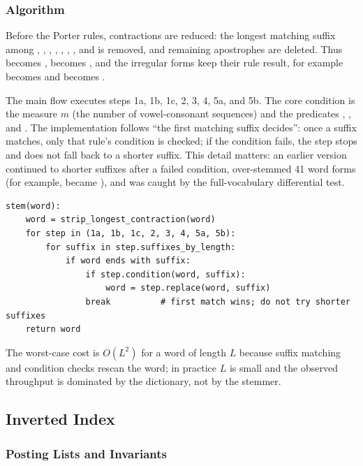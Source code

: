 \subsubsection{Algorithm}

Before the Porter rules, contractions are reduced: the longest matching suffix
among , , , , , ,
, and  is removed, and remaining apostrophes are deleted.
Thus  becomes ,  becomes , and
the irregular forms keep their rule result, for example  becomes
 and  becomes .

The main flow executes steps 1a, 1b, 1c, 2, 3, 4, 5a, and 5b. The core
condition is the measure $m$ (the number of vowel-consonant sequences) and the
predicates , , and . The implementation follows
``the first matching suffix decides'': once a suffix matches, only that rule's
condition is checked; if the condition fails, the step stops and does not fall
back to a shorter suffix. This detail matters: an earlier version continued to
shorter suffixes after a failed condition, over-stemmed 41 word forms (for
example,  became ), and was caught by the
full-vocabulary differential test.

\begin{lstlisting}[style=cli]
stem(word):
    word = strip_longest_contraction(word)
    for step in (1a, 1b, 1c, 2, 3, 4, 5a, 5b):
        for suffix in step.suffixes_by_length:
            if word ends with suffix:
                if step.condition(word, suffix):
                    word = step.replace(word, suffix)
                break          # first match wins; do not try shorter suffixes
    return word
\end{lstlisting}

The worst-case cost is $O(L^2)$ for a word of length $L$ because suffix
matching and condition checks rescan the word; in practice $L$ is small and the
observed throughput is dominated by the dictionary, not by the stemmer.

\subsection{Inverted Index}
\label{sec:posting}

\subsubsection{Posting Lists and Invariants}

